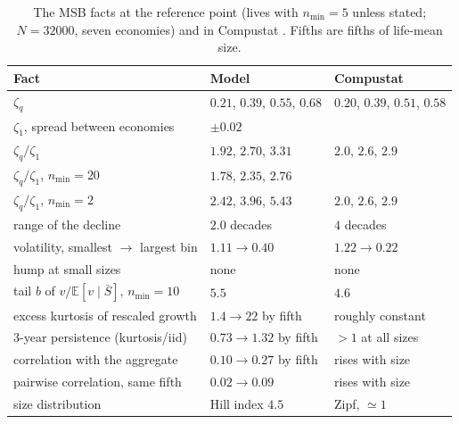 \documentclass[pre,twocolumn,superscriptaddress,nofootinbib]{revtex4-2}
\newcommand{\E}{\mathbb E}
\newcommand{\Sb}{\bar S}
\begin{document}
\begin{table}[t]
\caption{The MSB facts at the reference point (lives with $n_{\min}=5$ unless stated; $N=32000$, seven
economies) and in Compustat \cite{moran2024}.  Fifths are fifths of
life-mean size.}
\label{tab:facts}
\begin{ruledtabular}
\begin{tabular}{lll}
Fact & Model & Compustat\\
\hline
$\zeta_q$ & $0.21$, $0.39$, $0.55$, $0.68$ & $0.20$, $0.39$, $0.51$, $0.58$\\
$\zeta_1$, spread between economies & $\pm0.02$ & \\
$\zeta_q/\zeta_1$ & $1.92$, $2.70$, $3.31$ & $2.0$, $2.6$, $2.9$\\
$\zeta_q/\zeta_1$, $n_{\min}=20$ & $1.78$, $2.35$, $2.76$ & \\
$\zeta_q/\zeta_1$, $n_{\min}=2$ & $2.42$, $3.96$, $5.43$ & $2.0$, $2.6$, $2.9$\\
range of the decline & $2.0$ decades & $4$ decades\\
volatility, smallest $\to$ largest bin & $1.11\to0.40$ & $1.22\to0.22$\\
hump at small sizes & none & none\\
tail $b$ of $v/\E[v\mid\Sb]$, $n_{\min}=10$ & $5.5$ & $4.6$\\
excess kurtosis of rescaled growth & $1.4\to22$ by fifth & roughly constant\\
3-year persistence (kurtosis/iid) & $0.73\to1.32$ by fifth & $>1$ at all sizes\\
correlation with the aggregate & $0.10\to0.27$ by fifth & rises with size\\
pairwise correlation, same fifth & $0.02\to0.09$ & rises with size\\
size distribution & Hill index $4.5$ & Zipf, $\simeq1$\\
\end{tabular}
\end{ruledtabular}
\end{table}
\end{document}
